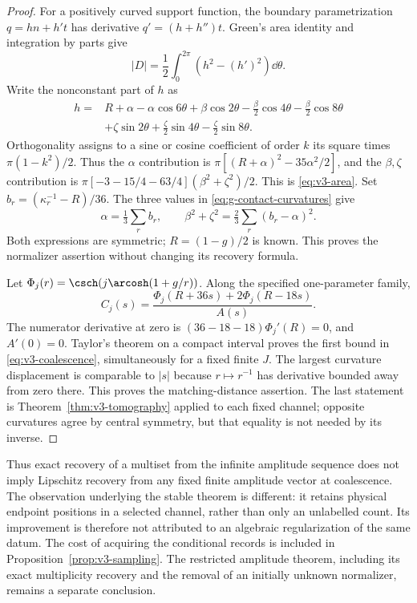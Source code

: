 \begin{proof}
For a positively curved support function, the boundary parametrization
$q=h n+h't$ has derivative $q'=(h+h'')t$. Green's area identity and
integration by parts give
\[
 |D|=\frac12\int_0^{2\pi}(h^2-(h')^2)\dd\theta.
\]
Write the nonconstant part of $h$ as
\[
 \begin{split}
 h={}&R+\alpha-\alpha\cos6\theta
       +\beta\cos2\theta-\tfrac\beta2\cos4\theta
                         -\tfrac\beta2\cos8\theta\\
     &+\zeta\sin2\theta+\tfrac\zeta2\sin4\theta
                         -\tfrac\zeta2\sin8\theta.
 \end{split}
\]
Orthogonality assigns to a sine or cosine coefficient of order $k$
its square times $\pi(1-k^2)/2$. Thus the $\alpha$ contribution is
$\pi[(R+\alpha)^2-35\alpha^2/2]$, and the $\beta,\zeta$
contribution is $\pi[-3-15/4-63/4](\beta^2+\zeta^2)/2$.
This is \eqref{eq:v3-area}. Set $b_r=(\kappa_r^{-1}-R)/36$.
The three values in \eqref{eq:g-contact-curvatures} give
\[
 \alpha=\tfrac13\sum_r b_r,\qquad
 \beta^2+\zeta^2=\tfrac23\sum_r(b_r-\alpha)^2.
\]
Both expressions are symmetric; $R=(1-g)/2$ is known. This proves
the normalizer assertion without changing its recovery formula.

Let $\Phi_j(r)=\csch(j\arcosh(1+g/r))$. Along the specified
one-parameter family,
\[
 C_j(s)=\frac{\Phi_j(R+36s)+2\Phi_j(R-18s)}{A(s)}.
\]
The numerator derivative at zero is
$(36-18-18)\Phi_j'(R)=0$, and $A'(0)=0$.
Taylor's theorem on a compact interval proves the first bound in
\eqref{eq:v3-coalescence}, simultaneously for a fixed finite $J$.
The largest curvature displacement is comparable to $|s|$ because
$r\mapsto r^{-1}$ has derivative bounded away from zero there.
This proves the matching-distance assertion. The last statement is
Theorem~\ref{thm:v3-tomography} applied to each fixed channel; opposite
curvatures agree by central symmetry, but that equality is not needed
by its inverse.
\end{proof}

Thus exact recovery of a multiset from the infinite amplitude sequence
does not imply Lipschitz recovery from any fixed finite amplitude
vector at coalescence. The observation underlying the stable theorem
is different: it retains physical endpoint positions in a selected
channel, rather than only an unlabelled count. Its improvement is
therefore not attributed to an algebraic regularization of the same
datum. The cost of acquiring the conditional records is included in
Proposition~\ref{prop:v3-sampling}. The restricted amplitude theorem,
including its exact multiplicity recovery and the removal of an
initially unknown normalizer, remains a separate conclusion.
